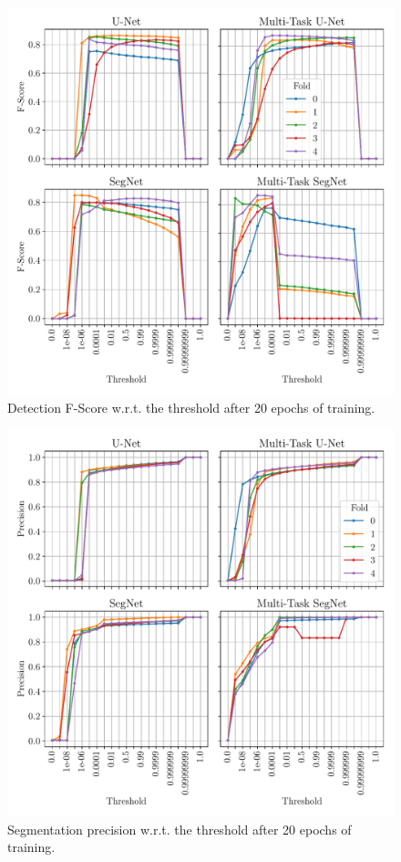 \documentclass[twocolumn,superscriptaddress,aps,nofootinbib]{revtex4-1}
\begin{document}
\begin{figure}[h]
    \centering
    \includegraphics[width=\columnwidth]{resources/pdf/detection_f.pdf}
    \caption{Detection F-Score w.r.t. the threshold after 20 epochs of training.}
    \label{fig:detection_f}
\end{figure}

\begin{figure}[h]
    \centering
    \includegraphics[width=\columnwidth]{resources/pdf/segmentation_p.pdf}
    \caption{Segmentation precision w.r.t. the threshold after 20 epochs of training.}
    \label{fig:segmentation_p}
\end{figure}
\end{document}
